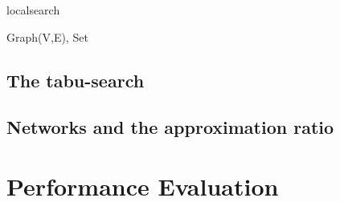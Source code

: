 \documentclass [12pt]{article}
\begin{document}
\begin {algorithm} [H]
\caption {localsearch}
\begin {algorithmic} [3]
\Require Graph(V,E), Set
\end {algorithmic}
\end {algorithm}
\subsection{The tabu-search}
\subsection{Networks and the approximation ratio}
\section{Performance Evaluation}
\end{document}
